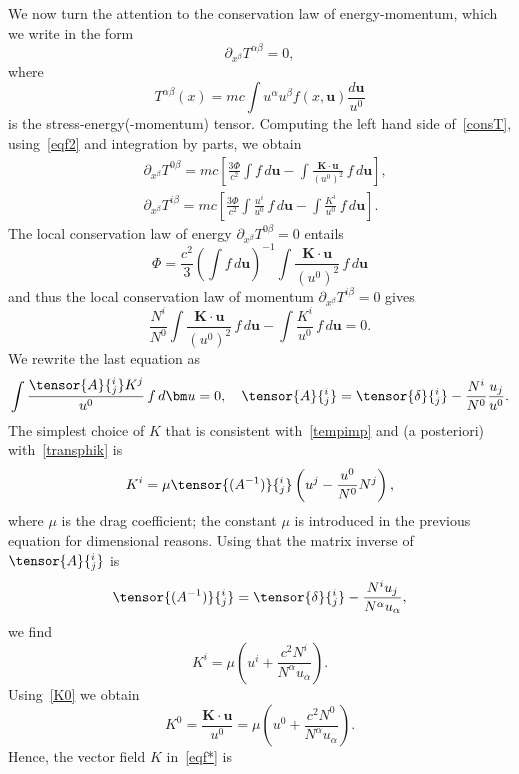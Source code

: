 \documentclass[12pt]{article}
\theoremstyle{definition}
\numberwithin{equation}{section}
\begin{document}
We now turn the attention to the conservation law of energy-momentum, which we write in the form
\begin{equation}\label{consT}
\partial_{x^\beta}T^{\alpha\beta}=0,
\end{equation}
where
\begin{equation}\label{T}
T^{\alpha\beta}(x)=mc\int u^\alpha u^\beta f(x,{\bm u})\frac{d{\bm u}}{u^0}
\end{equation}
is the stress-energy(-momentum) tensor.  Computing the left hand side of~\eqref{consT}, using~\eqref{eqf2} and integration by parts, we obtain 
\begin{align*}
&\partial_{x^\beta}T^{0\beta}=mc\left[\frac{3\Phi}{c^2}\int f\,d{\bm u}-\int \frac{{\bm K}\cdot{\bm u}}{(u^0)^2}\,f\,d{\bm u}\right],\\
&\partial_{x^\beta}T^{i\beta}=mc\left[\frac{3\Phi}{c^2}\int \frac{u^i}{u^0}\,f\,d{\bm u}-\int \frac{K^i}{u^0}\,f\,d{\bm u}\right].
\end{align*}
The local conservation law of energy $\partial_{x^\beta}T^{0\beta}=0$ entails
\begin{equation}\label{sigma1}
\Phi=\frac{c^2}{3}\left(\int f\,d{\bm u}\right)^{-1}\int \frac{{\bm K}\cdot{\bm u}}{(u^0)^2}\,f\,d{\bm u}
\end{equation}
and thus the local conservation law of momentum $\partial_{x^\beta}T^{i\beta}=0$ gives
\[
\frac{N^i}{N^0}\int \frac{{\bm K}\cdot{\bm u}}{(u^0)^2}\,f\,d{\bm u}-\int \frac{K^i}{u^0}\,f\,d{\bm u}=0.
\]
We rewrite the last equation as
\begin{equation}\label{tempimp}
\int \frac{\tensor{A}{^i_j}K^j}{u^0}\,f\,d{\bm u}=0,\quad \tensor{A}{^i_j}=\tensor{\delta}{^i_j}-\frac{N^i}{N^0} \frac{u_j}{u^0}.
\end{equation}
The simplest choice of $K$ that is consistent with~\eqref{tempimp} and (a posteriori) with~\eqref{transphik} is
\[
K^i=\mu \tensor{(A^{-1})}{^i_j}\left(u^j-\frac{u^0}{N^0}N^j\right),
\]
where $\mu$ is the drag coefficient; the constant $\mu$ is introduced in the previous equation for dimensional reasons.
Using that the matrix inverse of $\tensor{A}{^i_j}$ is 
\[
\tensor{(A^{-1})}{^i_j}=\tensor{\delta}{^i_j}-\frac{N^iu_j}{N^\alpha u_\alpha},
\]
we find
\begin{equation}\label{ki}
K^i=\mu\left(u^i+\frac{c^2 N^i}{N^\alpha u_\alpha}\right).
\end{equation}
Using~\eqref{K0} we obtain
\[
K^0=\frac{{\bm K}\cdot {\bm u}}{u^0}=\mu\left(u^0+\frac{c^2N^0}{N^\alpha u_\alpha}\right).
\] 
Hence, the vector field $K$ in~\eqref{eqf*} is
\end{document}
